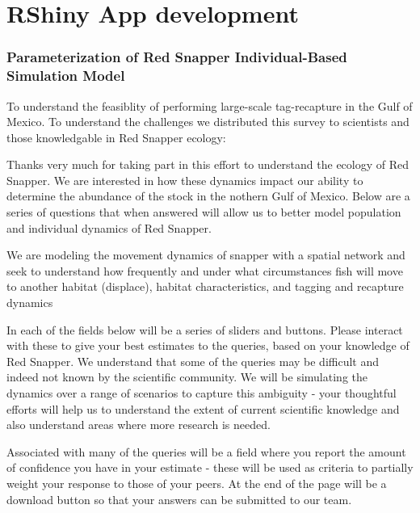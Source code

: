 \documentclass[]{article}
\title{}
\author{}
\date{}
\begin{document}
{
\setcounter{tocdepth}{3}
\tableofcontents
}
\hypertarget{rshiny-app-development}{%
\section{RShiny App development}\label{rshiny-app-development}}

\hypertarget{parameterization-of-red-snapper-individual-based-simulation-model}{%
\subsubsection{Parameterization of Red Snapper Individual-Based
Simulation
Model}\label{parameterization-of-red-snapper-individual-based-simulation-model}}

To understand the feasiblity of performing large-scale tag-recapture in
the Gulf of Mexico. To understand the challenges we distributed this
survey to scientists and those knowledgable in Red Snapper ecology:

Thanks very much for taking part in this effort to understand the
ecology of Red Snapper. We are interested in how these dynamics impact
our ability to determine the abundance of the stock in the nothern Gulf
of Mexico. Below are a series of questions that when answered will allow
us to better model population and individual dynamics of Red Snapper.

We are modeling the movement dynamics of snapper with a spatial network
and seek to understand how frequently and under what circumstances fish
will move to another habitat (displace), habitat characteristics, and
tagging and recapture dynamics

In each of the fields below will be a series of sliders and buttons.
Please interact with these to give your best estimates to the queries,
based on your knowledge of Red Snapper. We understand that some of the
queries may be difficult and indeed not known by the scientific
community. We will be simulating the dynamics over a range of scenarios
to capture this ambiguity - your thoughtful efforts will help us to
understand the extent of current scientific knowledge and also
understand areas where more research is needed.

Associated with many of the queries will be a field where you report the
amount of confidence you have in your estimate - these will be used as
criteria to partially weight your response to those of your peers. At
the end of the page will be a download button so that your answers can
be submitted to our team.
\end{document}

